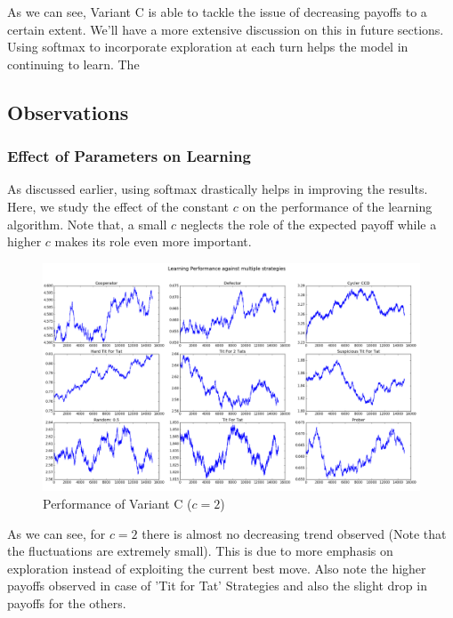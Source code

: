 \documentclass[a4paper]{article}
\begin{document}
	As we can see, Variant C is able to tackle the issue of decreasing payoffs to a certain extent. We'll have a more extensive discussion on this in future sections. Using softmax to incorporate exploration at each turn helps the model in continuing to learn. The 
	
	\subsection{Observations}
	
	\subsubsection{Effect of Parameters on Learning}

	As discussed earlier, using softmax drastically helps in improving the results. Here, we study the effect of the constant $c$ on the performance of the learning algorithm. Note that, a small $c$ neglects the role of the expected payoff while a higher $c$ makes its role even more important.

	\begin{figure}[H]
	\centering
	\includegraphics[width=\textwidth]{learnerInitialC_b2.png}
	\caption*{{Performance of Variant C ($c = 2$)}}
	\end{figure}
	
	As we can see, for $c=2$ there is almost no decreasing trend observed (Note that the fluctuations are extremely small). This is due to more emphasis on exploration instead of exploiting the current best move. Also note the higher payoffs observed in case of 'Tit for Tat' Strategies and also the slight drop in payoffs for the others.
\end{document}
